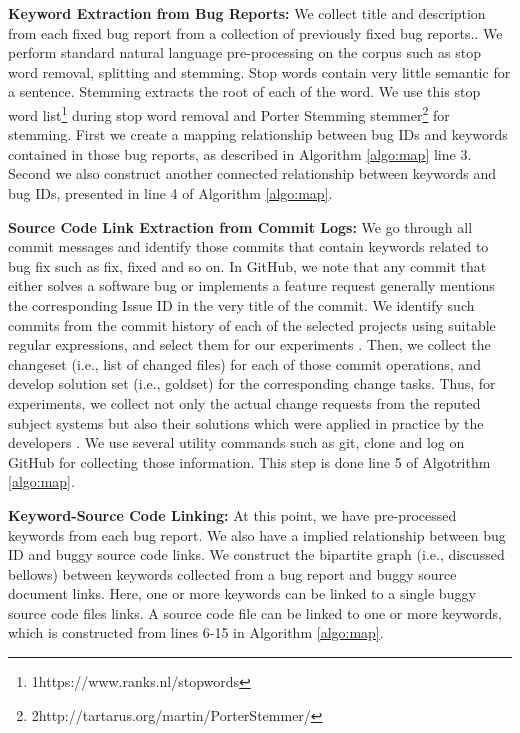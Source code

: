 \documentclass[conference]{IEEEtran}
\begin{document}
\textbf{Keyword Extraction from Bug Reports:} We collect title and description from each fixed bug report from a collection of previously fixed bug reports.. We perform standard natural language pre-processing on the corpus such as stop word removal, splitting and stemming. Stop words contain very little semantic for a sentence. Stemming extracts the root of each of the word. We use this stop word list\footnote{{1}https://www.ranks.nl/stopwords} during stop word removal and Porter Stemming stemmer\footnote{{2}http://tartarus.org/martin/PorterStemmer/} for stemming. First we create a mapping relationship between bug IDs and keywords contained in those bug reports, as described in Algorithm \ref{algo:map} line 3. Second we also construct another connected relationship between keywords and bug IDs, presented in
line 4 of Algorithm \ref{algo:map}.



\textbf{Source Code Link Extraction from Commit Logs:}
We go through all commit messages and identify those commits that contain keywords related to bug fix such as fix, fixed and so on.
In  GitHub, we  note  that any commit that either solves a software bug or implements a feature request generally mentions the corresponding Issue ID
in the very title of the commit.
We identify such commits from the commit history of each of the selected projects using suitable regular expressions, and select them for our experiments
\cite{Bachmann}. Then, we collect the changeset (i.e., list of changed files)
for each of those commit operations, and develop solution set (i.e.,
goldset) for the corresponding change tasks. Thus, for experiments, we collect not only the actual change requests from the reputed subject systems but also their solutions which were applied in practice by the developers \cite{SHaiduc}. We use several
utility commands such as git, clone and log on GitHub for collecting those information. This step is done line 5 of Algotrithm \ref{algo:map}. 

\textbf{Keyword-Source Code Linking:}
At this point, we have pre-processed keywords from each bug report. We also have a implied relationship between bug ID and buggy source code links. We construct the bipartite graph (i.e., discussed bellows) between keywords collected from a bug report and buggy source document links. Here, one or more keywords can be linked to a single buggy source code files links. A source code file can be linked to one or more keywords, which is constructed from lines 6-15 in Algorithm \ref{algo:map}.
\end{document}

